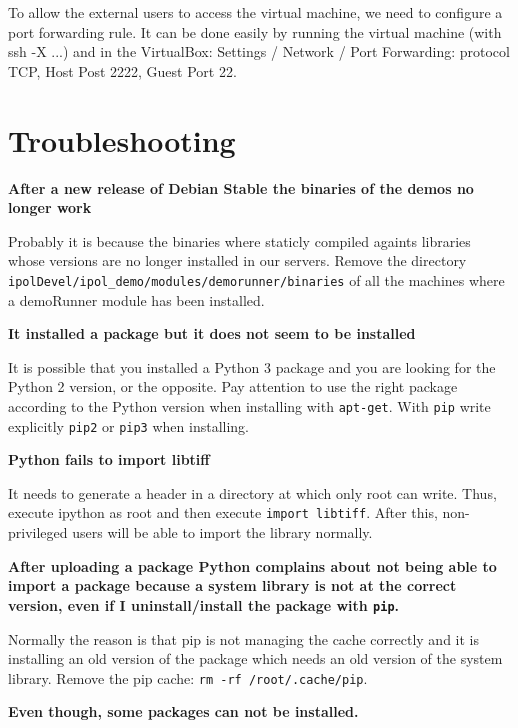 \documentclass[a4paper,12pt]{article}
\begin{document}
To allow the external users to access the virtual machine, we need to configure a port forwarding rule.
It can be done easily by running the virtual machine (with ssh -X ...) and in the VirtualBox: Settings / Network / Port Forwarding: protocol TCP, Host Post 2222, Guest Port 22.

\section{Troubleshooting}

\textbf{After a new release of Debian Stable the binaries of the demos no longer work}

Probably it is because the binaries where staticly compiled againts libraries whose versions are no longer installed in our servers. Remove the directory {\tt ipolDevel/ipol\_demo/modules/demorunner/binaries} of all the machines where a demoRunner module has been installed.
\vspace{0.5cm}

\textbf{It installed a package but it does not seem to be installed}

It is possible that you installed a Python 3 package and you are looking for the Python 2 version, or the opposite. Pay attention to use the right package according to the Python version when installing with {\tt apt-get}. With {\tt pip} write explicitly {\tt pip2} or {\tt pip3} when installing.
\vspace{0.5cm}


\textbf{Python fails to import libtiff}

It needs to generate a header in a directory at which only root can write. Thus, execute ipython as root and then execute {\tt import libtiff}. After this, non-privileged users will be able to import the library normally.
\vspace{0.5cm}

\textbf{After uploading a package Python complains about not being able to import a package because a system library is not at the correct version, even if I uninstall/install the package with {\tt pip}.}

Normally the reason is that pip is not managing the cache correctly and it is installing an old version of the package which needs an old version of the system library. Remove the pip cache: {\tt rm -rf /root/.cache/pip}.
\vspace{0.5cm}

\textbf{Even though, some packages can not be installed.}
\end{document}
